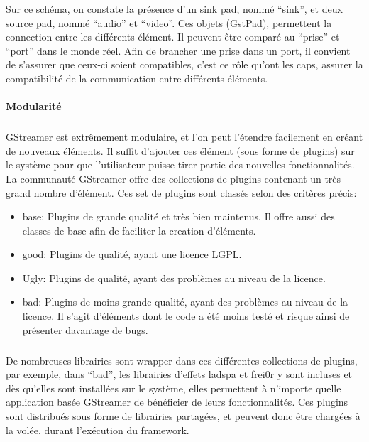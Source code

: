 Sur ce schéma, on constate la présence d'un sink pad, nommé ``sink'',
et deux source pad, nommé ``audio'' et ``video''. Ces objets (GstPad),
permettent la connection entre les différents élément. Il peuvent être
comparé au ``prise'' et ``port'' dans le monde réel.  Afin de brancher
une prise dans un port, il convient de s'assurer que ceux-ci soient
compatibles, c'est ce rôle qu'ont les caps, assurer la compatibilité
de la communication entre différents éléments.

\paragraph {Modularité}

\subparagraph{}

GStreamer est extrêmement modulaire, et l'on peut l'étendre facilement
en créant de nouveaux éléments. Il suffit d'ajouter ces élément
(sous forme de plugins) sur le système pour que l'utilisateur puisse
tirer partie des nouvelles fonctionnalités. La communauté GStreamer
offre des collections de plugins contenant un très grand nombre
d'élément. Ces set de plugins sont classés selon des critères précis:

\begin{itemize}

  \item {base: Plugins de grande qualité et très bien maintenus. Il
  offre aussi
    des classes de base afin de faciliter la creation d'éléments.}

  \item {good: Plugins de qualité, ayant une licence LGPL}.

  \item {Ugly: Plugins de qualité, ayant des problèmes au niveau de
  la licence.}

  \item {bad: Plugins de moins grande qualité, ayant des problèmes
  au niveau
    de la licence. Il s'agit d'éléments dont le code a été moins
    testé et risque ainsi de présenter davantage de bugs.}

\end{itemize}

\subparagraph{}

De nombreuses librairies sont wrapper dans ces différentes collections
de plugins, par exemple, dans ``bad'', les librairies d'effets ladspa et
frei0r y sont incluses et dès qu'elles sont installées sur le système,
elles permettent à n'importe quelle application basée GStreamer de
bénéficier de leurs fonctionnalités.  Ces plugins sont distribués
sous forme de librairies partagées, et peuvent donc être chargées à
la volée, durant l'exécution du framework.

